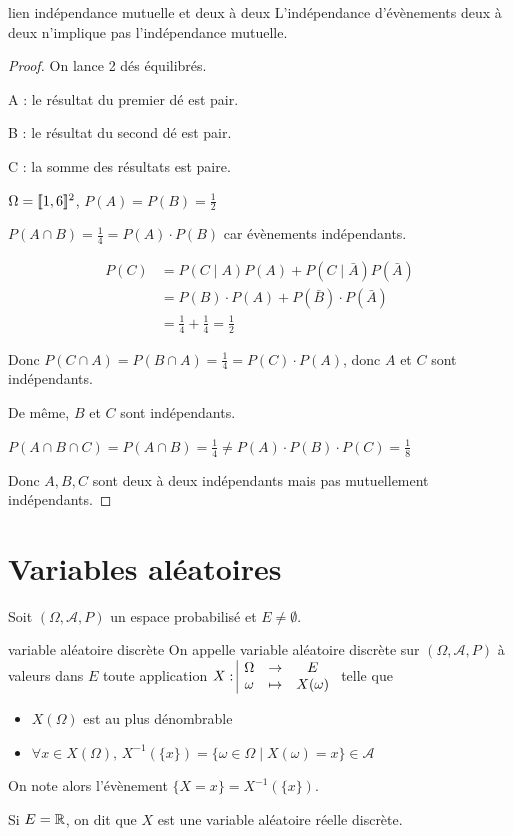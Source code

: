 \begin{proposition}{lien indépendance mutuelle et deux à deux}{}
    L'indépendance d'évènements deux à deux n'implique pas l'indépendance mutuelle.
\end{proposition}

\begin{proof}
    On lance 2 dés équilibrés.

    A : le résultat du premier dé est pair.

    B : le résultat du second dé est pair.

    C : la somme des résultats est paire.

    $\Omega = [\![1, 6]\!] ^2$, $P(A) = P(B) = \frac 1 2$

    $P(A \cap B) = \frac 1 4 = P(A) \cdot P(B)$ car évènements indépendants.

    \begin{align}
        P(C) & = P(C \mid A) P(A) + P(C \mid \bar A) P(\bar A) \\
        & = P(B) \cdot P(A) + P(\bar B) \cdot P(\bar A) \\
        & = \frac 1 4 + \frac 1 4 = \frac 1 2 
    \end{align} 

    Donc $P(C \cap A) = P(B \cap A) = \frac 1 4 = P(C) \cdot P(A)$, donc 
    $A$ et $C$ sont indépendants.

    De même, $B$ et $C$ sont indépendants.

    $P(A \cap B \cap C) = P(A \cap B) = \frac 1 4 \neq P(A) \cdot P(B) \cdot P(C) = \frac 1 8$

    Donc $A, B, C$ sont deux à deux indépendants mais pas mutuellement indépendants.
\end{proof}

\section{Variables aléatoires }

Soit $(\Omega, \mathcal A, P)$ un espace probabilisé et $E \neq \emptyset$. 

\begin{definition}{variable aléatoire discrète}{}
    On appelle variable aléatoire discrète sur $(\Omega, \mathcal A, P)$ à valeurs dans $E$
    toute application $X: \space \begin{array}{|ccc} \displaystyle \Omega & \to & \displaystyle E \\ \displaystyle \omega & \mapsto & \displaystyle X(\omega) \end{array}$ telle que 
    \begin{itemize}
        \item $X(\Omega)$ est au plus dénombrable
        \item $\forall x \in X(\Omega), \, X^{-1}(\{x\}) = \{\omega \in \Omega \mid X(\omega) = x\} \in \mathcal A$
    \end{itemize}

    On note alors l'évènement $\{X = x\} = X^{-1}(\{x\})$.
    
    Si $E = \mathbb{R}$, on dit que $X$ est une variable aléatoire réelle discrète.
\end{definition}


